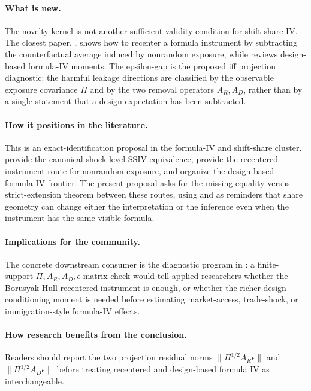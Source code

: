 \documentclass[11pt]{article}
\theoremstyle{definition}
\theoremstyle{plain}
\theoremstyle{remark}
\begin{document}
\paragraph{What is new.}
The novelty kernel is not another sufficient validity condition for shift-share IV.  The closest paper, \citet{BorusyakHull2023Econometrica}, shows how to recenter a formula instrument by subtracting the counterfactual average induced by nonrandom exposure, while \citet{BorusyakHullJaravel2025ECTJ} reviews design-based formula-IV moments.  The epsilon-gap is the proposed iff projection diagnostic: the harmful leakage directions are classified by the observable exposure covariance \(\Pi\) and by the two removal operators \(A_R,A_D\), rather than by a single statement that a design expectation has been subtracted.

\paragraph{How it positions in the literature.}
This is an exact-identification proposal in the formula-IV and shift-share cluster.  \citet{BorusyakHullJaravel2022REStud} provide the canonical shock-level SSIV equivalence, \citet{BorusyakHull2023Econometrica} provide the recentered-instrument route for nonrandom exposure, and \citet{BorusyakHullJaravel2025ECTJ} organize the design-based formula-IV frontier.  The present proposal asks for the missing equality-versus-strict-extension theorem between these routes, using \citet{GoldsmithPinkhamSorkinSwift2020AER} and \citet{AdaoKolesarMorales2019QJE} as reminders that share geometry can change either the interpretation or the inference even when the instrument has the same visible formula.

\paragraph{Implications for the community.}
The concrete downstream consumer is the diagnostic program in \citet{BorusyakHullJaravel2025ECTJ}: a finite-support \(\Pi,A_R,A_D,\epsilon\) matrix check would tell applied researchers whether the Borusyak-Hull recentered instrument is enough, or whether the richer design-conditioning moment is needed before estimating market-access, trade-shock, or immigration-style formula-IV effects.

\paragraph{How research benefits from the conclusion.}
Readers should report the two projection residual norms \(\|\Pi^{1/2}A_R\epsilon\|\) and \(\|\Pi^{1/2}A_D\epsilon\|\) before treating recentered and design-based formula IV as interchangeable.
\end{document}
